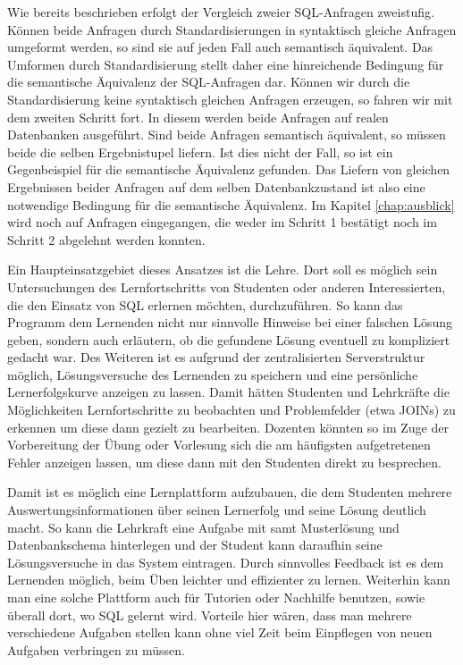 Wie bereits beschrieben erfolgt der Vergleich zweier SQL-Anfragen zweistufig. Können beide Anfragen durch Standardisierungen in syntaktisch gleiche Anfragen umgeformt werden, so sind sie auf jeden Fall auch semantisch äquivalent. Das Umformen durch Standardisierung stellt daher eine hinreichende Bedingung für die semantische Äquivalenz der SQL-Anfragen dar. Können wir durch die Standardisierung keine syntaktisch gleichen Anfragen erzeugen, so fahren wir mit dem zweiten Schritt fort. In diesem werden beide Anfragen auf realen Datenbanken ausgeführt. Sind beide Anfragen semantisch äquivalent, so müssen beide die selben Ergebnistupel liefern. Ist dies nicht der Fall, so ist ein Gegenbeispiel für die semantische Äquivalenz gefunden. Das Liefern von gleichen Ergebnissen beider Anfragen auf dem selben Datenbankzustand ist also eine notwendige Bedingung für die semantische Äquivalenz. Im Kapitel \ref{chap:ausblick} wird noch auf Anfragen eingegangen, die weder im Schritt 1 bestätigt noch im Schritt 2 abgelehnt werden konnten. 


Ein Haupteinsatzgebiet dieses Ansatzes ist die Lehre. Dort soll es möglich sein Untersuchungen des Lernfortschritts von Studenten oder anderen Interessierten, die den Einsatz von SQL erlernen möchten, durchzuführen. So kann das Programm dem Lernenden nicht nur sinnvolle Hinweise bei einer falschen Lösung geben, sondern auch erläutern, ob die gefundene Lösung eventuell zu kompliziert gedacht war. Des Weiteren ist es aufgrund der zentralisierten Serverstruktur möglich, Lösungsversuche des Lernenden zu speichern und eine persönliche Lernerfolgskurve anzeigen zu lassen. Damit hätten Studenten und Lehrkräfte die Möglichkeiten Lernfortschritte zu beobachten und Problemfelder (etwa JOINs) zu erkennen um diese dann gezielt zu bearbeiten. Dozenten könnten so im Zuge der Vorbereitung der Übung oder Vorlesung sich die am häufigsten aufgetretenen Fehler anzeigen lassen, um diese dann mit den Studenten direkt zu besprechen.

Damit ist es möglich eine Lernplattform aufzubauen, die dem Studenten mehrere Auswertungsinformationen über seinen Lernerfolg und seine Lösung deutlich macht. So kann die Lehrkraft eine Aufgabe mit samt Musterlösung und Datenbankschema hinterlegen und der Student kann daraufhin seine Lösungsversuche in das System eintragen. Durch sinnvolles Feedback ist es dem Lernenden möglich, beim Üben leichter und effizienter zu lernen. Weiterhin kann man eine solche Plattform auch für Tutorien oder Nachhilfe benutzen, sowie überall dort, wo SQL gelernt wird. Vorteile hier wären, dass man mehrere verschiedene Aufgaben stellen kann ohne viel Zeit beim Einpflegen von neuen Aufgaben verbringen zu müssen.

